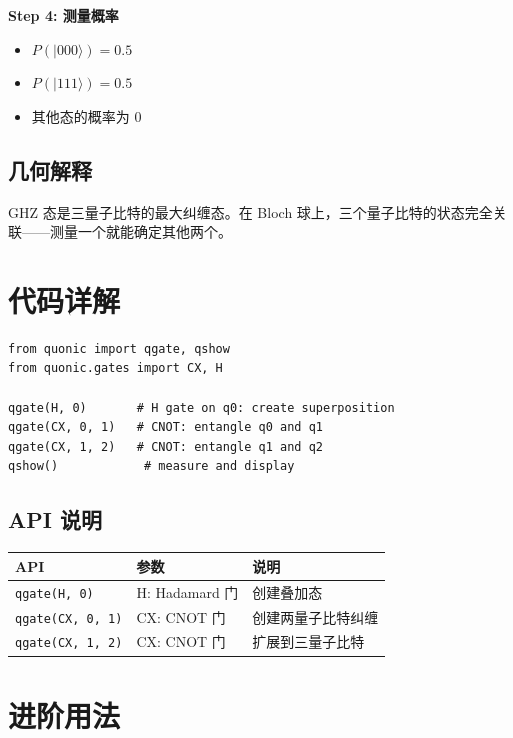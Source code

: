 \documentclass[12pt,a4paper]{article}
\begin{document}
\textbf{Step 4: 测量概率}

\begin{itemize}
  \item $P(|000\rangle) = 0.5$
  \item $P(|111\rangle) = 0.5$
  \item 其他态的概率为 0
\end{itemize}

\subsection{几何解释}

GHZ 态是三量子比特的最大纠缠态。在 Bloch 球上，三个量子比特的状态完全关联——测量一个就能确定其他两个。

\section{代码详解}

\begin{lstlisting}[style=python]
from quonic import qgate, qshow
from quonic.gates import CX, H

qgate(H, 0)       # H gate on q0: create superposition
qgate(CX, 0, 1)   # CNOT: entangle q0 and q1
qgate(CX, 1, 2)   # CNOT: entangle q1 and q2
qshow()            # measure and display
\end{lstlisting}

\subsection{API 说明}

\begin{center}
\begin{tabular}{|l|l|l|}
\hline
\textbf{API} & \textbf{参数} & \textbf{说明} \\
\hline
\texttt{qgate(H, 0)} & H: Hadamard 门 & 创建叠加态 \\
\hline
\texttt{qgate(CX, 0, 1)} & CX: CNOT 门 & 创建两量子比特纠缠 \\
\hline
\texttt{qgate(CX, 1, 2)} & CX: CNOT 门 & 扩展到三量子比特 \\
\hline
\end{tabular}
\end{center}

\section{进阶用法}
\end{document}
